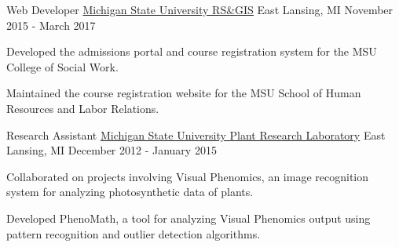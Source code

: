 \begin{cventries}
  \cventry
    {Web Developer}
    {\href{http://www.rsgis.msu.edu}{Michigan State University RS\&GIS}}
    {East Lansing, MI}
    {November 2015 - March 2017}
    {
      \begin{cvitems}
        \item {Developed the admissions portal and course registration system for the MSU College of Social Work.}
        \item {Maintained the course registration website for the MSU School of Human Resources and Labor Relations.}
      \end{cvitems}
    }

  \cventry
    {Research Assistant}
    {\href{https://prl.natsci.msu.edu/}{Michigan State University Plant Research Laboratory}}
    {East Lansing, MI}
    {December 2012 - January 2015}
    {
      \begin{cvitems}
        \item {Collaborated on projects involving Visual Phenomics, an image recognition system for analyzing photosynthetic data of plants.}
        \item {Developed PhenoMath, a tool for analyzing Visual Phenomics output using pattern recognition and outlier detection algorithms.}
      \end{cvitems}
    }

\end{cventries}
